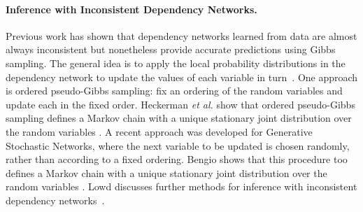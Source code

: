 \documentclass[runningheads,a4paper]{llncs}
\newcommand{\etal}{\textit{et al.}}
\begin{document}
\paragraph{Inference with Inconsistent Dependency Networks.}
 Previous work has shown that dependency networks learned from data are almost always inconsistent but nonetheless provide accurate predictions using Gibbs sampling. The general idea is to apply the local probability distributions in the dependency network to update the values of each variable in turn~\cite{Heckerman2000,Neville2007,Lowd2012}. One approach is ordered pseudo-Gibbs sampling: fix an ordering of the random variables and update each in the fixed order. Heckerman \etal{} show that  
 ordered pseudo-Gibbs sampling defines a Markov chain with a unique stationary joint distribution over the random variables \cite[Th.3]{Heckerman2000}. A recent approach was developed for Generative Stochastic Networks, where the next variable to be updated is chosen randomly, rather than according to a fixed ordering. Bengio shows that this procedure too defines a Markov chain with a unique stationary joint distribution over the random variables \cite[Sec.3.4]{Bengio2014}. Lowd discusses further methods for inference with inconsistent dependency networks~\cite{Lowd2012}.


\end{document}
